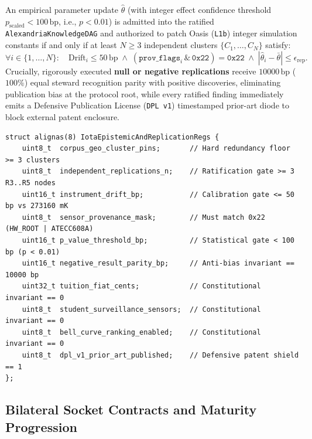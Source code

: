 \begin{theorem}
\label{thm:iota-replication}
An empirical parameter update $\hat{\theta}$ (with integer effect confidence threshold $p_{\mathrm{scaled}} < 100\,\mathrm{bp}$,
i.e., $p < 0.01$) is admitted into the ratified \texttt{AlexandriaKnowledgeDAG} and authorized to patch
Oasis (\texttt{L1b}) integer simulation constants if and only if at least $N \ge 3$ independent clusters
$\{C_1, \dots, C_N\}$ satisfy:
\begin{equation}
\forall i \in \{1,\dots,N\}:\quad \mathrm{Drift}_i \le 50\,\mathrm{bp} \;\land\;
(\mathtt{prov\_flags}_i \,\&\, \mathtt{0x22}) = \mathtt{0x22} \;\land\;
|\hat{\theta}_i - \bar{\theta}| \le \epsilon_{\mathrm{rep}}.
\end{equation}
Crucially, rigorously executed \textbf{null or negative replications} receive $10000\,\mathrm{bp}$ ($100\%$)
equal steward recognition parity with positive discoveries, eliminating publication bias at the protocol
root, while every ratified finding immediately emits a Defensive Publication License (\texttt{DPL v1})
timestamped prior-art diode to block external patent enclosure.
\end{theorem}

\begin{lstlisting}[caption={Scenario \texttt{Iota} 3-Cluster Corpus Pinning, Metrology Gate, and Inquiry Privacy Structs},label={lst:iota-structs}]
struct alignas(8) IotaEpistemicAndReplicationRegs {
    uint8_t  corpus_geo_cluster_pins;       // Hard redundancy floor >= 3 clusters
    uint8_t  independent_replications_n;    // Ratification gate >= 3 R3..R5 nodes
    uint16_t instrument_drift_bp;           // Calibration gate <= 50 bp vs 273160 mK
    uint8_t  sensor_provenance_mask;        // Must match 0x22 (HW_ROOT | ATECC608A)
    uint16_t p_value_threshold_bp;          // Statistical gate < 100 bp (p < 0.01)
    uint16_t negative_result_parity_bp;     // Anti-bias invariant == 10000 bp
    uint32_t tuition_fiat_cents;            // Constitutional invariant == 0
    uint8_t  student_surveillance_sensors;  // Constitutional invariant == 0
    uint8_t  bell_curve_ranking_enabled;    // Constitutional invariant == 0
    uint8_t  dpl_v1_prior_art_published;    // Defensive patent shield == 1
};
\end{lstlisting}

\subsection{Bilateral Socket Contracts and Maturity Progression}

